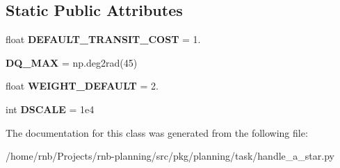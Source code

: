 \subsection*{Static Public Attributes}
\begin{DoxyCompactItemize}
\item 
\mbox{\label{classrnb-planning_1_1src_1_1pkg_1_1planning_1_1task_1_1handle__a__star_1_1_handle_astar_ad49512378fe3b5152f54ffb7af7077a8}} 
float {\bfseries D\+E\+F\+A\+U\+L\+T\+\_\+\+T\+R\+A\+N\+S\+I\+T\+\_\+\+C\+O\+ST} = 1.
\item 
\mbox{\label{classrnb-planning_1_1src_1_1pkg_1_1planning_1_1task_1_1handle__a__star_1_1_handle_astar_a4a00c1ac452597e6a050f9339f88763a}} 
{\bfseries D\+Q\+\_\+\+M\+AX} = np.\+deg2rad(45)
\item 
\mbox{\label{classrnb-planning_1_1src_1_1pkg_1_1planning_1_1task_1_1handle__a__star_1_1_handle_astar_a1f273e568a5d59579a91728cb37b1af1}} 
float {\bfseries W\+E\+I\+G\+H\+T\+\_\+\+D\+E\+F\+A\+U\+LT} = 2.
\item 
\mbox{\label{classrnb-planning_1_1src_1_1pkg_1_1planning_1_1task_1_1handle__a__star_1_1_handle_astar_af0c9b2be131e3dffc0d24ff244e3889c}} 
int {\bfseries D\+S\+C\+A\+LE} = 1e4
\end{DoxyCompactItemize}


The documentation for this class was generated from the following file\+:\begin{DoxyCompactItemize}
\item 
/home/rnb/\+Projects/rnb-\/planning/src/pkg/planning/task/handle\+\_\+a\+\_\+star.\+py\end{DoxyCompactItemize}
